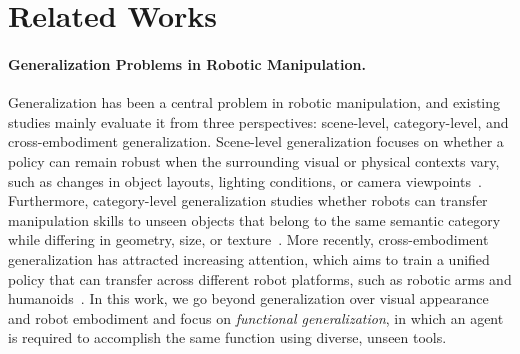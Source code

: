 \section{Related Works}
\label{sec:related_works}

\paragraph{Generalization Problems in Robotic Manipulation.}
Generalization has been a central problem in robotic manipulation, and existing studies mainly evaluate it from three perspectives: scene-level, category-level, and cross-embodiment generalization.
Scene-level generalization focuses on whether a policy can remain robust when the surrounding visual or physical contexts vary, such as changes in object layouts, lighting conditions, or camera viewpoints~\cite{goyal2023rvt, shridhar2023perceiver, shridhar2022cliport, nair2023r3m}. 
Furthermore, category-level generalization studies whether robots can transfer manipulation skills to unseen objects that belong to the same semantic category while differing in geometry, size, or texture~\cite{gao2021kpam, mo2021where2act, geng2023gapartnet}.
More recently, cross-embodiment generalization has attracted increasing attention, which aims to train a unified policy that can transfer across different robot platforms, such as robotic arms and humanoids~\cite{o2024open, team2024octo, intelligence2025pi}.
In this work, we go beyond generalization over visual appearance and robot embodiment and focus on \textit{functional generalization}, in which an agent is required to accomplish the same function using diverse, unseen tools.


